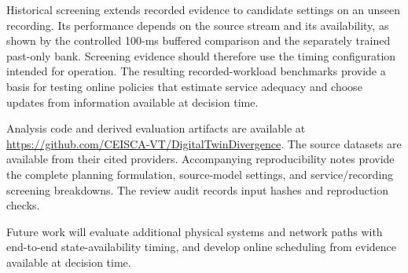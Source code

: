 \documentclass[journal]{IEEEtran}
\newcommand{\new}[1]{#1}
\newcommand{\rev}[1]{#1}
\newcommand{\revision}[1]{#1}
\begin{document}
\revision{Historical screening extends recorded evidence to candidate
settings on an unseen recording. Its performance depends on the source
stream and its availability, as shown by the controlled 100-ms buffered
comparison and the separately trained past-only bank. Screening evidence
should therefore use the timing configuration intended for operation.
The resulting recorded-workload benchmarks provide a basis for testing
online policies that estimate service adequacy and choose updates from
information available at decision time.}

Analysis code and derived evaluation artifacts are available at
\url{https://github.com/CEISCA-VT/DigitalTwinDivergence}. The source
datasets are available from their cited providers.
\rev{Accompanying reproducibility notes provide the complete planning
formulation, source-model settings, and service/recording screening
breakdowns. The review audit records input hashes and reproduction checks.}

Future work will evaluate additional physical systems and network paths
with end-to-end state-availability timing, and \new{develop online
scheduling from evidence available at decision time.}



\end{document}
